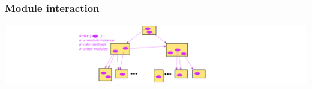 
\begin{frame}
\frametitle{Module interaction}

\begin{center}
\includegraphics[width=\textwidth]{../Figures/Fig_BSV_module_interaction}
\end{center}

\end{frame}






